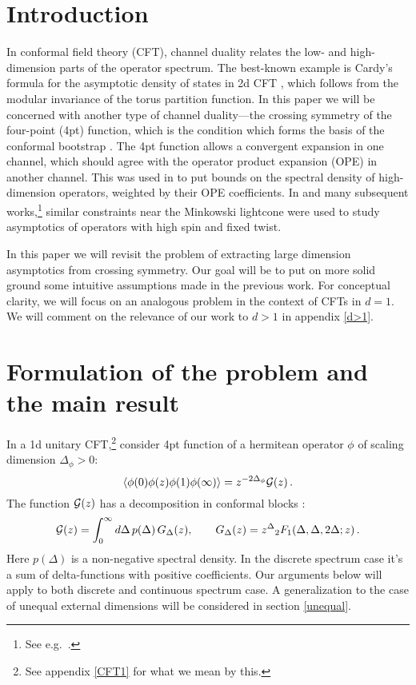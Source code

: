 \documentclass[12pt]{article}
\newcommand{\reef}[1]{(\ref{#1})}
\newcommand{\beq}{\begin{equation}}
\newcommand{\eeq}{\end{equation}}
\def\calG {{\cal G}}
\newcommand{\D}{\Delta}
\numberwithin{equation}{section}
\begin{document}
\section{Introduction}
In conformal field theory (CFT), channel duality relates the low- and high-dimension parts of the operator spectrum. The best-known example is Cardy's formula for the asymptotic density of states in 2d CFT \cite{Cardy:1986ie}, which follows from the modular invariance of the torus partition function. In this paper we will be concerned with another type of channel duality---the crossing symmetry of the four-point (4pt) function, which is the condition which forms the basis of the conformal bootstrap \cite{Ferrara:1973yt,Polyakov:1974gs,Mack:1975jr,Belavin:1984vu,Rattazzi:2008pe}. The 4pt function allows a convergent expansion in one channel, which should agree with the operator product expansion (OPE) in another channel. This was used in \cite{Pappadopulo:2012jk,Rychkov:2015lca} to put bounds on the spectral density of high-dimension operators, weighted by their OPE coefficients.
In \cite{Fitzpatrick:2012yx,Komargodski:2012ek} and many subsequent works,\footnote{See e.g.~\cite{Kaviraj:2015cxa, Alday:2015eya,Kaviraj:2015xsa,Alday:2015ota,Alday:2015ewa,Li:2015itl,Simmons-Duffin:2016wlq}.} similar constraints near the Minkowski lightcone were used to study asymptotics of operators with high spin and fixed twist.

In this paper we will revisit the problem of extracting large dimension asymptotics from crossing symmetry. Our goal will be to put on more solid ground some intuitive assumptions made in the previous work. For conceptual clarity, we will focus on an analogous problem in the context of CFTs in $d=1$. We will comment on the relevance of our work to $d>1$ in appendix \ref{d>1}.

\section{Formulation of the problem and the main result}
\label{formulation}

In a 1d unitary CFT,\footnote{See appendix \ref{CFT1} for what we mean by this.} consider 4pt function of a hermitean operator $\phi$ of scaling dimension $\Delta_\phi>0$:
\beq
\langle \phi(0)\phi(z)\phi(1)\phi(\infty)\rangle = z^{-2\Delta_\phi} \calG(z)\,.
\eeq
The function $\calG(z)$ has a decomposition in conformal blocks \cite{DO1,DO2,DO3}:
\beq
\calG(z) = \int_0^\infty d\Delta\, p(\Delta)\, G_{\Delta}(z),\qquad G_\D(z)=z^\D {}_2 F_1(\D,\D,2\D;z)\,.
\label{CBdec}
\eeq
Here $p(\Delta)$ is a non-negative spectral density. In the discrete spectrum case it's a sum of delta-functions with positive coefficients. Our arguments below will apply to both discrete and continuous spectrum case. A generalization to the case of unequal external dimensions will be considered in section \ref{unequal}.
 
\end{document}
